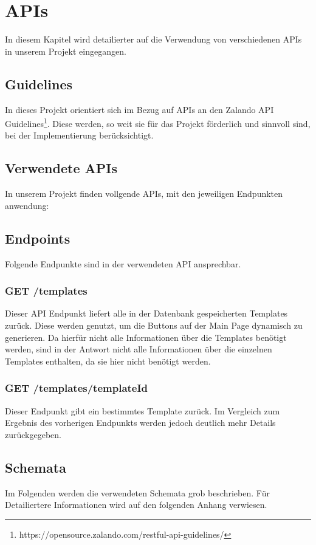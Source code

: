 \chapter{\ac{API}s}\label{ch:apis}
In diesem Kapitel wird detailierter auf die Verwendung von verschiedenen \ac{API}s in unserem Projekt
eingegangen.

\section{Guidelines}
In dieses Projekt orientiert sich im Bezug auf \ac{API}s an den Zalando API Guidelines\footnote{https://opensource.zalando.com/restful-api-guidelines/}. 
Diese werden, so weit sie für das Projekt förderlich und sinnvoll sind, bei der Implementierung 
berücksichtigt.
\section{Verwendete \ac{API}s}
In unserem Projekt finden vollgende \ac{API}s, mit den jeweiligen Endpunkten anwendung:

\section{Endpoints}
Folgende Endpunkte sind in der verwendeten \ac{API} ansprechbar.

\subsection{GET /templates}

Dieser \ac{API} Endpunkt liefert alle in der Datenbank gespeicherten Templates zurück. Diese
 werden genutzt, um die Buttons auf der Main Page dynamisch zu generieren. Da hierfür nicht 
 alle Informationen über die Templates benötigt werden, sind in der Antwort nicht alle 
 Informationen über die einzelnen Templates enthalten, da sie hier nicht benötigt werden.

 \subsection{GET /templates/{templateId}}
 Dieser Endpunkt gibt ein bestimmtes Template zurück. Im Vergleich zum Ergebnis des vorherigen 
 Endpunkts werden jedoch deutlich mehr Details zurückgegeben.

\section{Schemata}
Im Folgenden werden die verwendeten Schemata grob beschrieben. Für Detailiertere Informationen 
wird auf den folgenden Anhang verwiesen.

